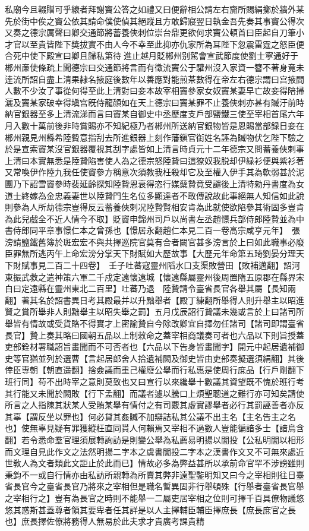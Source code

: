私廟今且輟贈可乎縗者拜謝竇公答之如禮又曰便辭相公請左右齎所賜絹擲於牆外某先於街中俟之竇公依其請命僕使偵其絕蹤且方敢歸寢翌日執金吾先奏其事竇公得次又奏之德宗厲聲曰卿交通節將蓄養俠刺位崇台鼎更欲何求竇公頓首曰臣起自刀筆小才官以至貴皆陛下奬拔實不由人今不幸至此抑亦仇家所為耳陛下忽震雷霆之怒臣便合死中使下殿宣曰卿且歸私第待進止越月貶郴州别駕會宣武節度使劉士寧通好于郴州亷使條疏上聞德宗曰交通節將言而有徵流竇公于驩州沒入家資一簪不著身竟未逹流所詔自盡上清果隸名掖庭後數年以善應對能煎茶數得在帝左右德宗謂曰宫掖間人數不少汝了事從何得至此上清對曰妾本故宰相竇參家女奴竇某妻早亡故妾得陪掃灑及竇某家破幸得塡宫旣侍龍顔如在天上德宗曰竇某罪不止養俠刺亦甚有贓汙前時納官銀器至多上清流涕而言曰竇某自御史中丞歷度支戶部鹽鐵三使至宰相首尾六年月入數十萬前後非時賞賜亦不知紀極乃者郴州所送納官銀物皆是恩賜當部録日妾在郴州親見州縣希陸䞇意指刮去所進銀器上刻作藩鎭官衘姓名誣為贓物伏乞陛下驗之於是宣索竇某沒官銀器覆視其刮字處皆如上清言時貞元十二年德宗又問蓄養俠刺事上清曰本實無悉是陸贄陷害使人為之德宗怒陸贄曰這獠奴我脱却伊緑衫便與紫衫著又常喚伊作陸九我任使竇參方稱意次須教我枉殺却它及至權入伊手其為軟弱甚於泥團乃下詔雪竇參時裴延齡探知陸贄恩衰得恣行媒糵贄竟受譴後上清特勑丹書度為女道士終嫁為金忠義妻世以陸贄門生名位多顯達者不敢傳說故此事絕無人知信如此說則參為人所劫德宗豈得反云蓄養俠刺况陸贄賢相安肯為此就使欲陷參其術固多豈肯為此兒戲全不近人情今不取】貶竇申錦州司戶以尚書左丞趙憬兵部侍郎陸贄並為中書侍郎同平章事憬仁本之曾孫也【憬居永翻趙仁本見二百一卷高宗咸亨元年】　張滂請鹽鐵舊簿於斑宏宏不與共擇巡院官莫有合者闕官甚多滂言於上曰如此職事必廢臣罪無所逃丙午上命宏滂分掌天下財賦如大歷故事【大歷元年命第五琦劉晏分理天下財賦事見二百二十四卷】　壬子吐蕃寇靈州䧟水口支渠敗營田【敗補邁翻】詔河東振武救之遣神策六軍二千戍定遠懷遠城【懷遠縣屬靈州後周置隋五原郡在縣界宋白曰定遠縣在靈州東北二百里】吐蕃乃退　陸贄請令臺省長官各舉其屬【長知兩翻】著其名於詔書異日考其殿最并以升黜舉者【殿丁練翻所舉得人則升舉主以昭進賢之賞所舉非人則黜舉主以昭失舉之罰】五月戊辰詔行贄議未幾或言於上曰諸司所舉皆有情故或受貨賂不得實才上密諭贄自今除改卿宜自擇勿任諸司【諸司即謂臺省長官】贄上奏其略曰國朝五品以上制敕命之蓋宰相商議奏可者也六品以下則旨授蓋吏部銓材署職詔旨畫聞而不可否者也【六品以下告身皆畫聞字】開元中起居遺補御史等官猶並列於選曹【言起居郎舍人拾遺補闕及御史皆由吏部奏擬選須絹翻】其後倖臣專朝【朝直遥翻】捨僉議而重己權廢公舉而行私惠是使周行庶品【行戶剛翻下班行同】苟不出時宰之意則莫致也又曰宣行以來纔舉十數議其資望既不愧於班行考其行能又未聞於闕敗【行下孟翻】而議者遽以騰口上煩聖聰道之難行亦可知矣請使所言之人指陳其狀某人受賄某舉有情付之有司覈其虛實謬舉者必行其罰誣善者亦反其辜【謂反坐以罪也】何必貸其姦贓不加辯詰私其公議不出主名【主名告主之名也】使無辜見疑有罪獲縱枉直同貰人何賴焉又宰相不過數人豈能徧諳多士【諳烏含翻】若令悉命羣官理須展轉詢訪是則變公舉為私薦易明揚以闇投【公私明闇以相形而文理自見此作文之法然明揚二字本之虞書闇投二字本之漢書作文又不可無來處近世敎人為文者類此文詎止於此而已】情故必多為弊益甚所以承前命官罕不涉謗雖則秉鈞不一或自行情亦由私訪所親轉為所賣其弊非遠聖鍳明知又曰今之宰相則往日臺省長官今之臺省長官乃將來之宰相但是職名暫異固非行舉頓殊【行舉者臺省長官舉之宰相行之】豈有為長官之時則不能舉一二屬吏居宰相之位則可擇千百具僚物議悠悠其惑斯甚蓋尊者領其要卑者任其詳是以人主擇輔臣輔臣擇庶長【庶長庶官之長也】庶長擇佐僚將務得人無易於此夫求才貴廣考課貴精